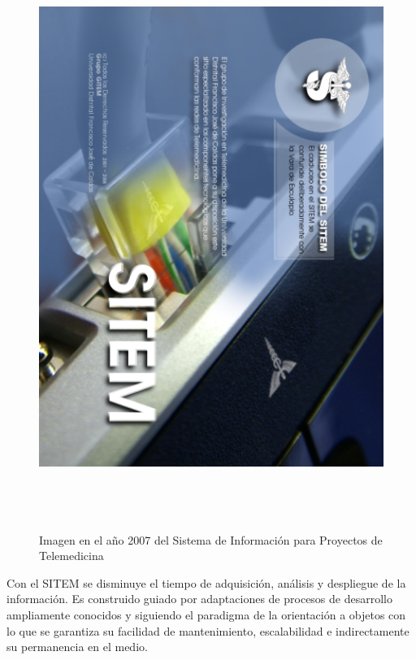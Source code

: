 \begin{figure}
 \centering
 \includegraphics[width=142mm, height=190mm]{sitem_principal.png}
 \caption{Imagen en el año 2007 del Sistema de Información para Proyectos de Telemedicina}
 \label{pantalla_sitem}
\end{figure}

Con el SITEM se disminuye el tiempo de adquisición, análisis y despliegue de la información. Es construido guiado por adaptaciones de procesos de desarrollo ampliamente conocidos \cite{koch}\cite{jacobson2000}\cite{larman2004} y siguiendo el paradigma de la orientación a objetos con lo que se garantiza su facilidad de mantenimiento, escalabilidad e indirectamente su permanencia en el medio.

